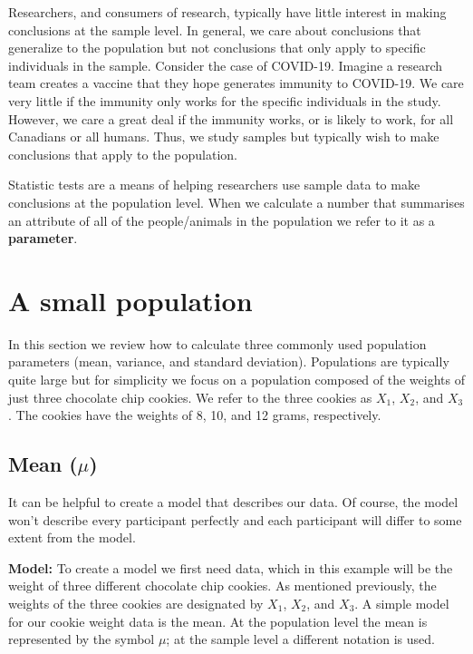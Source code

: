 \documentclass[
]{krantz}
\begin{document}
Researchers, and consumers of research, typically have little interest in making conclusions at the sample level. In general, we care about conclusions that generalize to the population but not conclusions that only apply to specific individuals in the sample. Consider the case of COVID-19. Imagine a research team creates a vaccine that they hope generates immunity to COVID-19. We care very little if the immunity only works for the specific individuals in the study. However, we care a great deal if the immunity works, or is likely to work, for all Canadians or all humans. Thus, we study samples but typically wish to make conclusions that apply to the population.

Statistic tests are a means of helping researchers use sample data to make conclusions at the population level. When we calculate a number that summarises an attribute of all of the people/animals in the population we refer to it as a \textbf{parameter}.

\hypertarget{a-small-population}{%
\section{A small population}\label{a-small-population}}

In this section we review how to calculate three commonly used population parameters (mean, variance, and standard deviation). Populations are typically quite large but for simplicity we focus on a population composed of the weights of just three chocolate chip cookies. We refer to the three cookies as \(X_1\), \(X_2\), and \(X_3\). The cookies have the weights of 8, 10, and 12 grams, respectively.

\hypertarget{mean-mu}{%
\subsection{\texorpdfstring{Mean (\(\mu\))}{Mean (\textbackslash mu)}}\label{mean-mu}}

It can be helpful to create a model that describes our data. Of course, the model won't describe every participant perfectly and each participant will differ to some extent from the model.

\textbf{Model:} To create a model we first need data, which in this example will be the weight of three different chocolate chip cookies. As mentioned previously, the weights of the three cookies are designated by \(X_1\), \(X_2\), and \(X_3\). A simple model for our cookie weight data is the mean. At the population level the mean is represented by the symbol \(\mu\); at the sample level a different notation is used.
\end{document}
